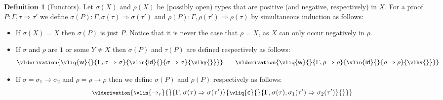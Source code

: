 \documentclass[10pt,a4paper]{amsart}
\theoremstyle{plain}
\theoremstyle{definition}
\newtheorem{definition}[definition]{Definition}
\theoremstyle{plain}
\theoremstyle{definition} %
\newcommand{\unit}{1}
\newcommand{\arrow}{\to}
\newcommand{\imp}{\arrow} %
\newcommand{\seqar}{\Rightarrow}
\newcommand{\id}{\mathsf{id}}
\newcommand{\ax}{\id}
\newcommand{\wk}{\mathsf{w}}
\newcommand{\contr}{\mathsf{c}}
\newcommand{\lr}[1]{#1_l}
\newcommand{\rr}[1]{#1_r}
\newcommand{\LJ}{\mathsf{LJ}}
\newcommand{\der}{P}
\begin{document}
\begin{definition}
    [Functors]
    \label{def:functors-in-muLJ}
 Let $\sigma(X) $ and $\rho(X)$ be (possibly open) types that are positive (and negative, respectively) in $X$. 
    For a proof $P:\Gamma, \tau \seqar \tau'$ we define $\sigma(P): \Gamma, \sigma(\tau)\seqar \sigma(\tau')$ and $\rho(P): \Gamma, \rho(\tau')\seqar \rho(\tau)$ by simultaneous induction as follows:
    \begin{itemize}
    \item If $\sigma(X)=X$ then $\sigma(\der)$ is just $\der$. Notice that it is never the  case that $\rho=X$, as $X$ can only occur negatively in $\rho$.
    \item If $\sigma$ and  $\rho$ are $\unit$ or some $Y\neq X$ then $\sigma(\der)$ and ${\tau}(\der)$ are defined respectively as follows: 
    \[
    \small
    \vlderivation{
    \vliq{\wk}{}{\Gamma, \sigma \seqar \sigma}{\vlin{\ax}{}{\sigma \seqar \sigma}{\vlhy{}}}
    }
    \qquad 
    \vlderivation{
    \vliq{\wk}{}{\Gamma, \rho \seqar \rho}{\vlin{\ax}{}{\rho \seqar \rho}{\vlhy{}}}
    }
    \]
    \item If $\sigma=\sigma_1 \imp \sigma_2$ and $\rho= \rho \imp \rho$ then we define $\sigma(\der)$ and $\rho(\der)$ respectively as follows:
    \[
    \footnotesize
    \vlderivation{
    \vlin{\rr \imp}{}{\Gamma, \sigma(\tau)\seqar \sigma(\tau')  }
     {
     \vliq{\contr}{}{\Gamma, \sigma(\tau) , \sigma_1(\tau')\seqar   \sigma_2(\tau')}{
}}}\]
\end{itemize}
\end{definition}
\end{document}
